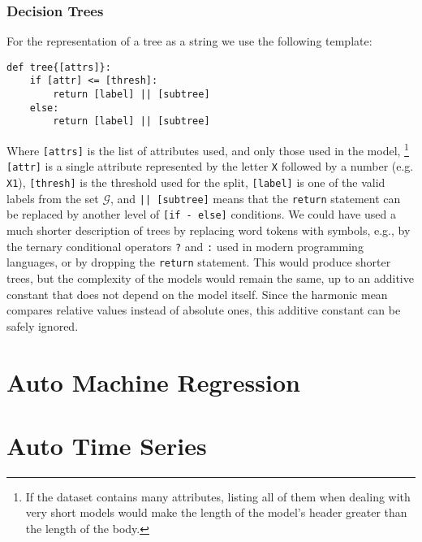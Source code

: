 \subsubsection*{Decision Trees}
\label{subsec:surfeit_decision_trees}

For the representation of a tree as a string we use the following template:

\begin{sourcecode}
{\scriptsize \begin{verbatim}
def tree{[attrs]}:
    if [attr] <= [thresh]:
        return [label] || [subtree]
    else:
        return [label] || [subtree]
\end{verbatim}}
\end{sourcecode}

Where \texttt{[attrs]} is the list of attributes used, and only those used in the model,%
\footnote{If the dataset contains many attributes, listing all of them when dealing with very short models would make the length of the model's header greater than the length of the body.}  \texttt{[attr]} is a single attribute represented by the letter \texttt{X} followed by a number (e.g. \texttt{X1}), \texttt{[thresh]} is the threshold used for the split, \texttt{[label]} is one of the valid labels from the set $\mathcal{G}$, and \texttt{|| [subtree]} means that the \texttt{return} statement can be replaced by another level of \texttt{[if - else]} conditions. We could have used a much shorter description of trees by replacing word tokens with symbols, e.g., by the ternary conditional operators \texttt{?} and \texttt{:} used in modern programming languages, or by dropping the \texttt{return} statement. This would produce shorter trees, but the complexity of the models would remain the same, up to an additive constant that does not depend on the model itself. Since the harmonic mean compares relative values instead of absolute ones, this additive constant can be safely ignored.



%
%

\section{Auto Machine Regression}


%
%

\section{Auto Time Series}


